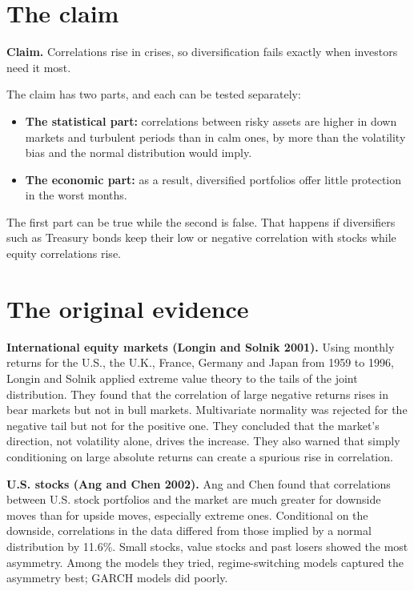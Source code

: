 \section{The claim}
\label{sec:20-claim}

\begin{callout}
\textbf{Claim.} Correlations rise in crises, so diversification fails exactly when investors need it most.
\end{callout}

The claim has two parts, and each can be tested separately:

\begin{itemize}
  \item \textbf{The statistical part:} correlations between risky assets are higher in down markets and turbulent periods than in calm ones, by more than the volatility bias and the normal distribution would imply.
  \item \textbf{The economic part:} as a result, diversified portfolios offer little protection in the worst months.
\end{itemize}

The first part can be true while the second is false. That happens if diversifiers such as Treasury bonds keep their low or negative correlation with stocks while equity correlations rise.

\section{The original evidence}
\label{sec:20-evidence}

\textbf{International equity markets (Longin and Solnik 2001).} Using monthly returns for the U.S., the U.K., France, Germany and Japan from 1959 to 1996, Longin and Solnik applied extreme value theory to the tails of the joint distribution. They found that the correlation of large negative returns rises in bear markets but not in bull markets. Multivariate normality was rejected for the negative tail but not for the positive one. They concluded that the market's direction, not volatility alone, drives the increase. They also warned that simply conditioning on large absolute returns can create a spurious rise in correlation.

\textbf{U.S. stocks (Ang and Chen 2002).} Ang and Chen found that correlations between U.S. stock portfolios and the market are much greater for downside moves than for upside moves, especially extreme ones. Conditional on the downside, correlations in the data differed from those implied by a normal distribution by 11.6\%. Small stocks, value stocks and past losers showed the most asymmetry. Among the models they tried, regime-switching models captured the asymmetry best; GARCH models did poorly.


